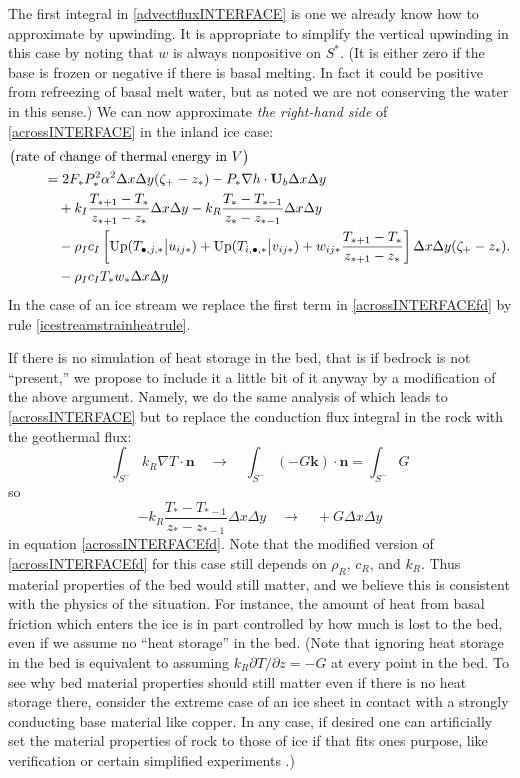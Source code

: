 \documentclass[12pt,final]{amsart}%
\theoremstyle{plain}
\theoremstyle{definition}
\theoremstyle{remark}
\newcommand{\grad}{\nabla}
\newcommand{\khat}{\mathbf{k}}
\newcommand{\nhat}{\mathbf{n}}
\newcommand{\Up}{\ensuremath{\operatorname{Up}}}
\newcommand{\bU}{{\mathbf{U}}}
\begin{document}
The first integral in \eqref{advectfluxINTERFACE} is one we already know how to approximate by upwinding.  It is appropriate to simplify the vertical upwinding in this case by noting that $w$ is always nonpositive on $S^\ast$.  (It is either zero if the base is frozen or negative if there is basal melting.  In fact it could be positive from refreezing of basal melt water, but as noted we are not conserving the water in this sense.)  We can now approximate \emph{the right-hand side} of \eqref{acrossINTERFACE} in the inland ice case:
\begin{align}
\big(\text{rate }&\text{of change of thermal energy in }V\big) \label{acrossINTERFACEfd}\\
    &= 2 F_\ast P_\ast^2 \alpha^2 \Delta x \Delta y (\zeta_+ - z_\ast) - P_\ast \grad h \cdot \bU_b \Delta x \Delta y \notag\\
    &\quad + k_I \frac{T_{\ast+1}-T_\ast}{z_{\ast+1}-z_\ast} \Delta x \Delta y  - k_R \frac{T_{\ast}-T_{\ast-1}}{z_{\ast}-z_{\ast-1}} \Delta x \Delta y \notag\\
    &\quad - \rho_I c_I \left[\Up(T_{\bullet,j,\ast} \big|u_{ij\ast}) + \Up(T_{i,\bullet,\ast} \big|v_{ij\ast}) + w_{ij\ast} \frac{T_{\ast+1}-T_\ast}{z_{\ast+1}-z_\ast}\right] \Delta x \Delta y (\zeta_+ - z_\ast). \notag \\
    &\quad - \rho_I c_I T_\ast w_\ast \Delta x \Delta y \notag
\end{align}
In the case of an ice stream we replace the first term in \eqref{acrossINTERFACEfd} by rule \eqref{icestreamstrainheatrule}.

If there is no simulation of heat storage in the bed, that is if bedrock is not ``present,'' we propose to include it a little bit of it anyway by a modification of the above argument.  Namely, we do the same analysis of which leads to \eqref{acrossINTERFACE} but to replace the conduction flux integral in the rock with the geothermal flux:
    $$\int_{S^-} k_R \grad T \cdot \nhat \quad\to\quad \int_{S^-} (-G\khat) \cdot \nhat = \int_{S^-} G$$
so
\begin{equation}\label{norockREPLACEfd}
- k_R \frac{T_{\ast}-T_{\ast-1}}{z_{\ast}-z_{\ast-1}} \Delta x \Delta y \quad\to\quad + G \Delta x \Delta y
\end{equation}
in equation \eqref{acrossINTERFACEfd}.  Note that the modified version of \eqref{acrossINTERFACEfd} for this case still depends on $\rho_R$, $c_R$, and $k_R$.  Thus material properties of the bed would still matter, and we believe this is consistent with the physics of the situation.  For instance, the amount of heat from basal friction which enters the ice is in part controlled by how much is lost to the bed, even if we assume no ``heat storage'' in the bed.  (Note that ignoring heat storage in the bed is equivalent to assuming $k_R\partial T/\partial z = -G$ at every point in the bed.  To see why bed material properties should still matter even if there is no heat storage there, consider the extreme case of an ice sheet in contact with a strongly conducting base material like copper.  In any case, if desired one can artificially set the material properties of rock to those of ice if that fits ones purpose, like verification \citep{BBL} or certain simplified experiments \citep{EISMINT00}.)
\end{document}
